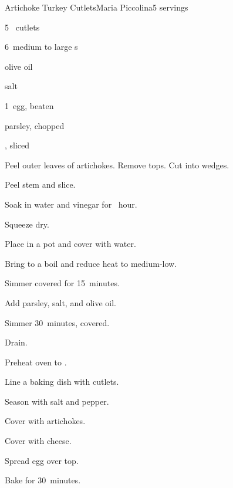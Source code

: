 \begin{recipe}{Artichoke Turkey Cutlets}{Maria Piccolina}{5 servings}

\begin{ingredients}
\item 5~ cutlets
\item 6~medium to large s
\item \Tp{2\half} olive oil
\item salt
\item 1~egg, beaten
\item parsley, chopped
\item {}, sliced
\end{ingredients}

\begin{directions}
\item Peel outer leaves of artichokes. Remove tops. Cut into wedges.
\item Peel stem and slice.
\item Soak in water and vinegar for \half~hour.
\item Squeeze dry.
\item Place in a pot and cover with water.
\item Bring to a boil and reduce heat to medium-low.
\item Simmer covered for 15~minutes.
\item Add parsley, salt, and olive oil.
\item Simmer 30~minutes, covered.
\item Drain.
\item Preheat oven to .
\item Line a baking dish with cutlets.
\item Season with salt and pepper.
\item Cover with artichokes.
\item Cover with cheese.
\item Spread egg over top.
\item Bake for 30~minutes.
\end{directions}

\end{recipe}
